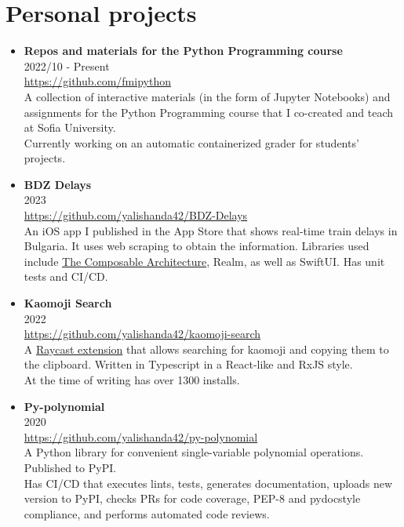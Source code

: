 \documentclass[11pt,a4paper]{article}
\begin{document}
\section{Personal projects}
\begin{itemize}[leftmargin=*]
    \item \textbf{Repos and materials for the Python Programming course} \\
    2022/10 - Present \\
    \href{https://github.com/fmipython}{https://github.com/fmipython} \\
    A collection of interactive materials (in the form of Jupyter Notebooks) and assignments for the Python Programming course
    that I co-created and teach at Sofia University. \\
    Currently working on an automatic containerized grader for students' projects.

    \item \textbf{BDZ Delays} \\
    2023 \\
    \href{https://github.com/yalishanda42/BDZ-Delays}{https://github.com/yalishanda42/BDZ-Delays} \\
    An iOS app I published in the App Store that shows real-time train delays in Bulgaria.
    It uses web scraping to obtain the information.
    Libraries used include \href{https://github.com/pointfreeco/swift-composable-architecture}{The Composable Architecture},
    Realm, as well as SwiftUI. Has unit tests and CI/CD.
    
    \item \textbf{Kaomoji Search} \\
    2022 \\
    \href{https://github.com/yalishanda42/kaomoji-search}{https://github.com/yalishanda42/kaomoji-search} \\
    A \href{https://www.raycast.com/yalishanda/kaomoji-search}{Raycast extension} that allows searching for kaomoji and copying them to the clipboard.
    Written in Typescript in a React-like and RxJS style. \\
    At the time of writing has over 1300 installs.
    
    \item \textbf{Py-polynomial} \\
    2020 \\
    \href{https://github.com/yalishanda42/py-polynomial}{https://github.com/yalishanda42/py-polynomial} \\
    A Python library for convenient single-variable polynomial operations. Published to PyPI. \\
    Has CI/CD that executes lints, tests, generates documentation, uploads new version to PyPI,
    checks PRs for code coverage, PEP-8 and pydocstyle compliance, and performs automated code reviews.
    

\end{itemize}
\end{document}

